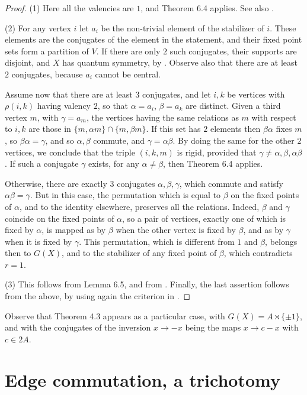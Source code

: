 \documentclass[11pt]{amsart}
\begin{document}
\begin{proof}
(1) Here all the valencies are $1$, and Theorem 6.4 applies. See also \cite{mn}.

(2) For any vertex $i$ let $a_i$ be the non-trivial element of the stabilizer of $i$. These elements are the conjugates of the element in the statement, and their fixed point sets form a partition of $V$. If there are only $2$ such conjugates, their supports are disjoint, and $X$ has quantum symmetry, by \cite{sch}. Observe also that there are at least $2$ conjugates, because $a_i$ cannot be central.

Assume now that there are at least $3$ conjugates, and let $i,k$ be vertices with $\rho(i,k)$ having valency $2$, so that $\alpha=a_i$, $\beta=a_k$ are distinct. Given a third vertex $m$, with $\gamma=a_m$, the vertices having the same relations as $m$ with respect to $i,k$ are those in $\{m,\alpha m\}\cap\{m,\beta m\}$. If this set has $2$ elements then $\beta\alpha$ fixes $m$, so $\beta\alpha=\gamma$, and so $\alpha,\beta$ commute, and $\gamma=\alpha\beta$. By doing the same for the other $2$ vertices, we conclude that the triple $(i,k,m)$ is rigid, provided that $\gamma\neq\alpha,\beta,\alpha\beta$. If such a conjugate $\gamma$ exists, for any $\alpha\neq\beta$, then Theorem 6.4 applies.

Otherwise, there are exactly $3$ conjugates $\alpha,\beta,\gamma$, which commute and satisfy $\alpha\beta=\gamma$. But in this case, the permutation which is equal to $\beta$ on the fixed points of $\alpha$, and to the identity elsewhere, preserves all the relations. Indeed, $\beta$ and $\gamma$ coincide on the fixed points of $\alpha$, so a pair of vertices, exactly one of which is fixed by $\alpha$, is mapped as by $\beta$ when the other vertex is fixed by $\beta$, and as by $\gamma$ when it is fixed by $\gamma$. This permutation, which is different from $1$ and $\beta$, belongs then to $G(X)$, and to the stabilizer of any fixed point of $\beta$, which contradicts $r=1$.

(3) This follows from Lemma 6.5, and from \cite{sch}. Finally, the last assertion follows from the above, by using again the criterion in \cite{sch}.
\end{proof}

Observe that Theorem 4.3 appears as a particular case, with $G(X)=A\rtimes\{\pm1\}$, and with the conjugates of the inversion $x\to-x$ being the maps $x\to c-x$ with $c\in2A$.

\section{Edge commutation, a trichotomy}
\end{document}
